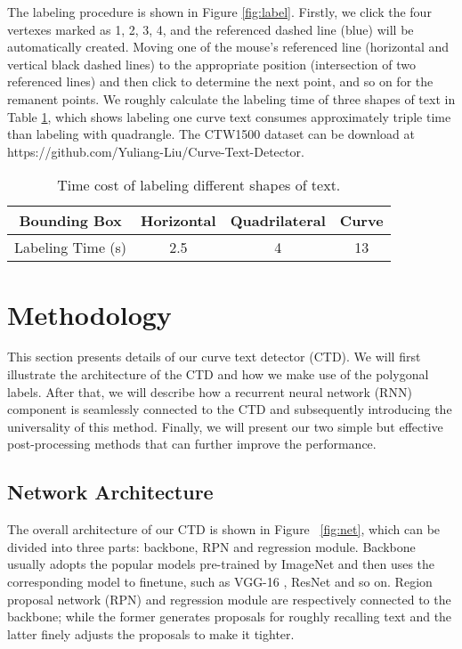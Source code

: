 \documentclass[10pt,twocolumn,letterpaper]{article}
\begin{document}
The labeling procedure is shown in Figure \ref{fig:label}. Firstly, we click the four vertexes marked as 1, 2, 3, 4, and the referenced dashed line (blue) will be automatically created. Moving one of the mouse's referenced line (horizontal and vertical black dashed lines) to the appropriate position (intersection of two referenced lines) and then click to determine the next point, and so on for the remanent points. We roughly calculate the labeling time of three shapes of text in Table \ref{tab:label}, which shows labeling one curve text consumes approximately triple time than labeling with quadrangle. The CTW1500 dataset can be download at {\color{blue} https://github.com/Yuliang-Liu/Curve-Text-Detector}.



\begin{table}[!t]
\caption{Time cost of labeling different shapes of text.}\label{tab:label}
\centering
\small
\begin{tabular}{|c|c|c|c|}
\hline
  Bounding Box & Horizontal  & Quadrilateral & Curve \\
  \hline
  \hline
   Labeling Time (s) & 2.5 & 4 & 13 \\
   \hline
\end{tabular}
\end{table}

\section{Methodology}
This section presents details of our curve text detector (CTD). We will first illustrate the architecture of the CTD and how we make use of the polygonal labels. After that, we will describe how a recurrent neural network (RNN) component is seamlessly connected to the CTD and subsequently introducing the universality of this method. Finally, we will present our two simple but effective post-processing methods that can further improve the performance. 

\subsection{Network Architecture}
The overall architecture of our CTD is shown in Figure ~\ref{fig:net}, which can be divided into three parts: backbone, RPN and regression module. Backbone usually adopts the popular models pre-trained by ImageNet \cite{deng2009imagenet} and then uses the corresponding model to finetune, such as VGG-16 \cite{simonyan2014very}, ResNet \cite{he2016deep} and so on. Region proposal network (RPN) and regression module are respectively connected to the backbone; while the former generates proposals for roughly recalling text and the latter finely adjusts the proposals to make it tighter.
\end{document}
